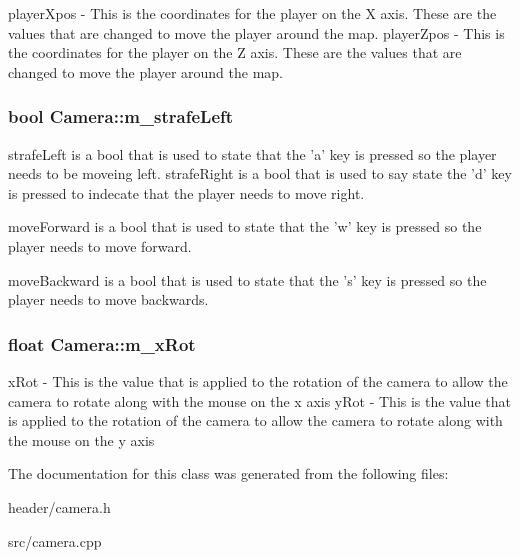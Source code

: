 playerXpos -\/ This is the coordinates for the player on the X axis. These are the values that are changed to move the player around the map. playerZpos -\/ This is the coordinates for the player on the Z axis. These are the values that are changed to move the player around the map. \hypertarget{classCamera_a6e86bb225fcbe085820f4331d9abe923}{
\subsubsection[{m\_\-strafeLeft}]{\setlength{\rightskip}{0pt plus 5cm}bool {\bf Camera::m\_\-strafeLeft}}}
\label{classCamera_a6e86bb225fcbe085820f4331d9abe923}


strafeLeft is a bool that is used to state that the 'a' key is pressed so the player needs to be moveing left. strafeRight is a bool that is used to say state the 'd' key is pressed to indecate that the player needs to move right.

moveForward is a bool that is used to state that the 'w' key is pressed so the player needs to move forward.

moveBackward is a bool that is used to state that the 's' key is pressed so the player needs to move backwards. \hypertarget{classCamera_ab2c726172275816059ddb628f9a20de4}{
\subsubsection[{m\_\-xRot}]{\setlength{\rightskip}{0pt plus 5cm}float {\bf Camera::m\_\-xRot}}}
\label{classCamera_ab2c726172275816059ddb628f9a20de4}


xRot -\/ This is the value that is applied to the rotation of the camera to allow the camera to rotate along with the mouse on the x axis yRot -\/ This is the value that is applied to the rotation of the camera to allow the camera to rotate along with the mouse on the y axis 

The documentation for this class was generated from the following files:\begin{DoxyCompactItemize}
\item 
header/camera.h\item 
src/camera.cpp\end{DoxyCompactItemize}
